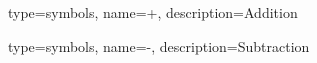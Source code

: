 


{
    type={symbols},
    name={+},
    description={Addition}
}

{
    type={symbols},
    name={-},
    description={Subtraction}
}
